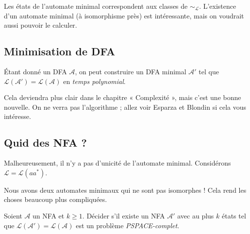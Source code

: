 \begin{remarque}
Les états de l'automate minimal correspondent aux classes de $\sim_{\mathcal{L}}$.
L'existence d'un automate minimal (à isomorphisme près) est intéressante, mais on voudrait aussi pouvoir le calculer.
\end{remarque}

\subsection*{Minimisation de DFA}

\begin{proposition}
Étant donné un DFA $\mathcal{A}$, on peut construire un DFA minimal $\mathcal{A}'$ tel que $\mathcal{L}(\mathcal{A}') = \mathcal{L}(\mathcal{A})$ en \emph{temps polynomial}.
\end{proposition}

\begin{remarque}
Cela deviendra plus clair dans le chapitre « Complexité », mais c'est une bonne nouvelle.
On ne verra pas l'algorithme ; allez voir Esparza et Blondin si cela vous intéresse.
\end{remarque}

\subsection*{Quid des NFA ?}

Malheureusement, il n'y a pas d'unicité de l'automate minimal. Considérons $\mathcal{L} = \mathcal{L}(aa^*)$.
\begin{center}
\end{center}
Nous avons deux automates minimaux qui ne sont pas isomorphes ! Cela rend les choses beaucoup plus compliquées.

\begin{theoreme}
Soient $\mathcal{A}$ un NFA et $k \geq 1$. Décider s'il existe un NFA $\mathcal{A}'$ avec au plus $k$ états tel que $\mathcal{L}(\mathcal{A}') = \mathcal{L}(\mathcal{A})$ est un problème \emph{PSPACE-complet}.
\end{theoreme}

